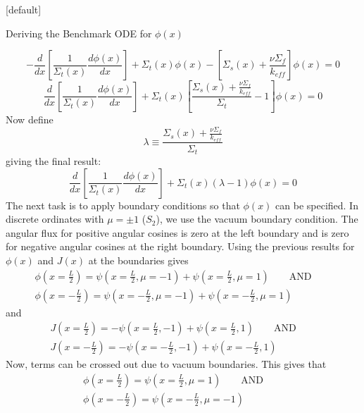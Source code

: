 \documentclass[9pt,t,aspectratio=169]{beamer}
\makeatletter
\newcommand{\QAND}{\qquad \text{AND} \qquad}
\newenvironment{withoutheadline}{
       \setbeamertemplate{headline}[default]
       \def\beamer@entrycode{\vspace*{-\headheight}}
    }{}
\makeatother
\begin{document}
\begin{withoutheadline}
\begin{frame}[allowframebreaks]{Deriving the Benchmark ODE for $\phi(x)$}
\begin{itemize}
\begin{equation}
            -\frac{d}{dx}\left\lbrack\frac{1}{\Sigma_{t}(x)} \frac{d\phi(x)}{dx} \right\rbrack + \Sigma_{t}(x)\phi(x) -
            \left\lbrack\Sigma_{s}(x) + \frac{\nu \Sigma_{f}}{k_{eff}}\right\rbrack\phi(x) = 0
        \end{equation}
        \begin{equation}
            \frac{d}{dx}\left\lbrack\frac{1}{\Sigma_{t}(x)} \frac{d\phi(x)}{dx} \right\rbrack + \Sigma_{t}(x)
            \left\lbrack\frac{\Sigma_{s}(x) + \frac{\nu \Sigma_{f}}{k_{eff}}}{\Sigma_{t}} - 1\right\rbrack\phi(x) = 0
        \end{equation}
        Now define
        \begin{equation}
            \lambda \equiv \frac{\Sigma_{s}(x) + \frac{\nu \Sigma_{f}}{k_{eff}}}{\Sigma_{t}}
        \end{equation}
        giving the final result:
        \begin{equation}
            \frac{d}{dx}\left\lbrack\frac{1}{\Sigma_{t}(x)} \frac{d\phi(x)}{dx} \right\rbrack + \Sigma_{t}(x)
            \left(\lambda - 1\right)\phi(x) = 0
        \end{equation}
        \newpage
        The next task is to apply boundary conditions so that $\phi(x)$ can be specified. In discrete ordinates with $\mu=\pm1$ ($S_{2}$), we use the vacuum boundary condition. The angular flux for positive angular cosines is zero at the left boundary and is zero for negative angular cosines at the right boundary.
        Using the previous results for $\phi(x)$ and $J(x)$ at the boundaries gives
        \begin{multline}
            \phi(x=\frac{L}{2}) =  \psi(x=\frac{L}{2},\mu =-1) + \psi(x=\frac{L}{2},\mu =1) \QAND  \\ \phi(x=-\frac{L}{2}) =  \psi(x=-\frac{L}{2},\mu =-1) + \psi(x=-\frac{L}{2},\mu =1)
        \end{multline}
        and
        \begin{multline}
            J(x=\frac{L}{2}) = - \psi(x=\frac{L}{2},-1)  + \psi(x=\frac{L}{2},1) \QAND \\ J(x=-\frac{L}{2}) = - \psi(x=-\frac{L}{2},-1)  + \psi(x=-\frac{L}{2},1)
        \end{multline}
        Now, terms can be crossed out due to vacuum boundaries. This gives that
        \begin{multline}
            \phi(x=\frac{L}{2}) =  \psi(x=\frac{L}{2},\mu =1) \QAND \\ \phi(x=-\frac{L}{2}) =  \psi(x=-\frac{L}{2},\mu =-1)

\end{multline}
\end{itemize}
\end{frame}
\end{withoutheadline}
\end{document}
